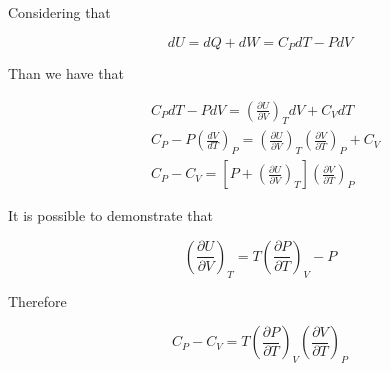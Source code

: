 Considering that

$$
d U = dQ + dW = C_P dT - PdV
$$

Than we have that 

\begin{align*}
    &C_P dT - PdV = \left(\frac{\partial U}{\partial V}\right)_T dV + C_V dT \\
    &C_P - P \left(\frac{dV}{dT}\right)_P = \left(\frac{\partial U}{\partial V}\right)_T \left(\frac{\partial V}{\partial T}\right)_P + C_V \\
    &C_P - C_V = \left[P + \left(\frac{\partial U}{\partial V}\right)_T\right] \left(\frac{\partial V}{\partial T}\right)_P
\end{align*}

It is possible to demonstrate that

$$
\left(\frac{\partial U}{\partial V}\right)_T = T \left(\frac{\partial P }{\partial T}\right)_V - P
$$

Therefore

\begin{equation}
    C_P - C_V = T \left(\frac{\partial P }{\partial T}\right)_V \left(\frac{\partial V }{\partial T}\right)_P
\end{equation}
